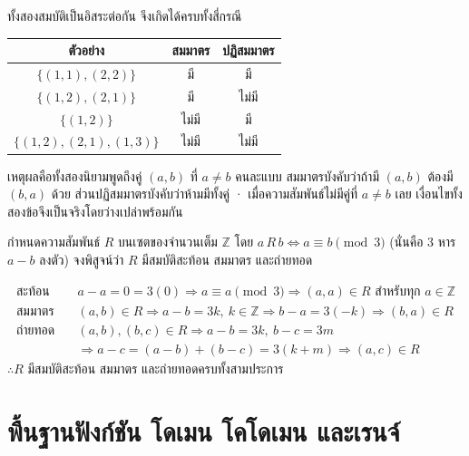 \begin{warning}
ทั้งสองสมบัติเป็นอิสระต่อกัน จึงเกิดได้ครบทั้งสี่กรณี

\begin{center}
\begin{tabular}{|c|c|c|}
\hline
\textbf{ตัวอย่าง} & \textbf{สมมาตร} & \textbf{ปฏิสมมาตร} \\
\hline
$\{(1,1),(2,2)\}$ & มี & มี \\
\hline
$\{(1,2),(2,1)\}$ & มี & ไม่มี \\
\hline
$\{(1,2)\}$ & ไม่มี & มี \\
\hline
$\{(1,2),(2,1),(1,3)\}$ & ไม่มี & ไม่มี \\
\hline
\end{tabular}
\end{center}

เหตุผลคือทั้งสองนิยามพูดถึงคู่ $(a,b)$ ที่ $a \neq b$ คนละแบบ สมมาตรบังคับว่าถ้ามี $(a,b)$ ต้องมี $(b,a)$ ด้วย ส่วนปฏิสมมาตรบังคับว่าห้ามมีทั้งคู่ · เมื่อความสัมพันธ์ไม่มีคู่ที่ $a \neq b$ เลย เงื่อนไขทั้งสองข้อจึงเป็นจริงโดยว่างเปล่าพร้อมกัน
\end{warning}

\begin{ex}
\label{ex:mod3-properties}
กำหนดความสัมพันธ์ $R$ บนเซตของจำนวนเต็ม $\mathbb{Z}$ โดย $a\,R\,b \iff a \equiv b \pmod 3$ (นั่นคือ $3$ หาร $a - b$ ลงตัว) จงพิสูจน์ว่า $R$ มีสมบัติสะท้อน สมมาตร และถ่ายทอด
\end{ex}
\begin{solution}
\begin{align*}
\text{สะท้อน} &\quad a - a = 0 = 3(0) \Rightarrow a \equiv a \pmod 3 \Rightarrow (a,a) \in R \text{ สำหรับทุก } a \in \mathbb{Z}\\
\text{สมมาตร} &\quad (a,b) \in R \Rightarrow a - b = 3k,\ k \in \mathbb{Z} \Rightarrow b - a = 3(-k) \Rightarrow (b,a) \in R\\
\text{ถ่ายทอด} &\quad (a,b),(b,c) \in R \Rightarrow a - b = 3k,\ b - c = 3m\\
&\quad \Rightarrow a - c = (a-b) + (b-c) = 3(k+m) \Rightarrow (a,c) \in R
\end{align*}
$\therefore R$ มีสมบัติสะท้อน สมมาตร และถ่ายทอดครบทั้งสามประการ \solhere
\end{solution}


\section{พื้นฐานฟังก์ชัน โดเมน โคโดเมน และเรนจ์}
\label{sec:functions}

